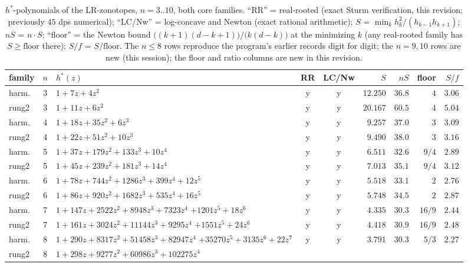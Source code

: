 \begin{table}[htbp]
\centering
\footnotesize
\caption{$h^*$-polynomials of the LR-zonotopes, $n=3..10$, both core
families. ``RR'' = real-rooted (exact Sturm verification, this
revision; previously $45$ dps numerical); ``LC/Nw'' = log-concave and
Newton (exact rational arithmetic); $S$ =
$\min_k h_k^2/(h_{k-1}h_{k+1})$; $nS$ = $n\cdot S$;
``floor'' = the Newton bound
$\bigl((k{+}1)(d{-}k{+}1)\bigr)/\bigl(k(d{-}k)\bigr)$ at the
minimizing $k$ (any real-rooted family has $S\ge\text{floor}$ there);
$S/f$ = $S/\text{floor}$. The $n\le8$ rows reproduce the program's
earlier records digit for digit; the $n=9,10$ rows are new (this
session); the floor and ratio columns are new in this revision.}
\label{tab:hstar}
\begin{tabularx}{\textwidth}{@{} l c >{\raggedright\arraybackslash}X c c r r r r @{}}
\toprule
family & $n$ & $h^*(z)$ & RR & LC/Nw & $S$ & $nS$ & floor & $S/f$ \\
\midrule
harm. & 3 & $1+7z+4z^2$ & y & y & $12.250$ & $36.8$ & $4$ & $3.06$ \\
rung2 & 3 & $1+11z+6z^2$ & y & y & $20.167$ & $60.5$ & $4$ & $5.04$ \\
harm. & 4 & $1+18z+35z^2+6z^3$ & y & y & $9.257$ & $37.0$ & $3$ & $3.09$ \\
rung2 & 4 & $1+22z+51z^2+10z^3$ & y & y & $9.490$ & $38.0$ & $3$ & $3.16$ \\
harm. & 5 & $1+37z+179z^2+133z^3+10z^4$ & y & y & $6.511$ & $32.6$ & $9/4$ & $2.89$ \\
rung2 & 5 & $1+45z+239z^2+181z^3+14z^4$ & y & y & $7.013$ & $35.1$ & $9/4$ & $3.12$ \\
harm. & 6 & $1+78z+744z^2+1286z^3+399z^4+12z^5$ & y & y & $5.518$
& $33.1$ & $2$ & $2.76$ \\
rung2 & 6 & $1+86z+920z^2+1682z^3+535z^4+16z^5$ & y & y & $5.748$
& $34.5$ & $2$ & $2.87$ \\
harm. & 7 & $1+147z+2522z^2+8948z^3+7323z^4$\newline
$+1201z^5+18z^6$ & y & y & $4.335$ & $30.3$ & $16/9$ & $2.44$ \\
rung2 & 7 & $1+161z+3024z^2+11144z^3+9295z^4$\newline
$+1551z^5+24z^6$ & y & y & $4.418$ & $30.9$ & $16/9$ & $2.48$ \\
harm. & 8 & $1+290z+8317z^2+51458z^3+82947z^4$\newline
$+35270z^5+3135z^6+22z^7$ & y & y & $3.791$ & $30.3$ & $5/3$ & $2.27$ \\
rung2 & 8 & $1+298z+9277z^2+60986z^3+102275z^4$\newline

\end{tabularx}
\end{table}
